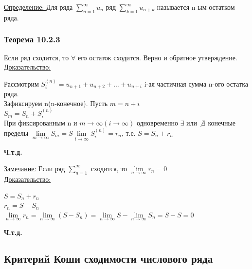 \documentclass[12pt]{article}
\let\oldsum\sum
\let\oldlim\lim
\renewcommand{\sum}{\oldsum\limits}
\renewcommand{\lim}{\oldlim\limits}
\begin{document}
  \underline{Определение: } Для ряда $\sum_{n=1}^{\infty}u_n$ ряд $\sum_{k=1}^{\infty}u_{n+k}$ называется n-ым остатком ряда.\\
  \subsubsection*{Теорема 10.2.3}\label{th:10.2.3.}
  \par\noindent
  Если ряд сходится, то $\forall$ его остаток сходится. Верно и обратное утверждение.\\

  \underline{Доказательство:}
  \begin{adjustwidth}{1.5em}{1.5em}
    Рассмотрим $S_i^{(n)}=u_{n+1}+u_{n+2}+\dots+u_{n+i}$ i-ая частичная сумма n-ого остатка ряда.\\
    Зафиксируем n(n-конечное).
    Пусть $m=n+i$\\
    $S_m=S_n+S_i^{(n)}$\\
    При фиксированным n и $m \to \infty(i \to \infty)$ одновременно $\exists$ или $\not \exists$ конечные
    пределы $\lim_{m\to \infty}S_m=S\lim_{i\to \infty}S_i^{(n)}=r_n$, т.е. $S=S_n+r_n$
  \end{adjustwidth}
  \begin{center}
    \textbf{Ч.т.д.}
  \end{center}
  \underline{Замечание:} Если ряд $\sum_{n=1}^{\infty}$ сходится, то $\lim_{n \to \infty}r_n=0$\\
  \underline{Доказательство:}
  \begin{adjustwidth}{1.5em}{1.5em}
    \begin{center}
      $S=S_n+r_n$\\
      $r_n=S-S_n$\\
      $\lim_{n\to \infty}r_n=\lim_{n \to \infty}(S-S_n)=\lim_{n \to \infty}S-\lim_{n\to \infty}S_n=S-S=0$
    \end{center}
  \end{adjustwidth}
  \begin{center}
    \textbf{Ч.т.д.}
  \end{center}
  
  \subsection{Критерий Коши сходимости числового ряда}
\end{document}
